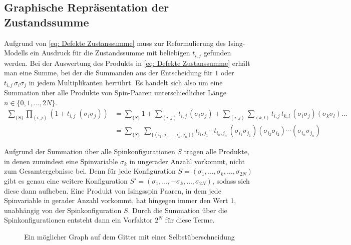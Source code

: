 \subsection{Graphische Repräsentation der Zustandssumme} \label{sec: GR_Zustandssumme}

Aufgrund von \eqref{eq: Defekte Zustanssumme} muss zur Reformulierung des Ising-Modells ein Ausdruck für die Zustandssumme mit beliebigen $t_{i,j}$ gefunden werden.
Bei der Auswertung des Produkts in \eqref{eq: Defekte Zustanssumme} erhält man eine Summe, bei der die Summanden aus der Entscheidung für $1$ oder $t_{i,j}\,\sigma_i \sigma_j$ in jedem Multiplikanten herrührt. Es handelt sich also um eine Summation über alle Produkte von Spin-Paaren unterschiedlicher Länge $n \in \{0,1,\dots ,2N\}$. 
\begin{align}
\sum_{\{S\}} \prod_{(i,j)} (1 +  t_{i,j} \; (\sigma_i \sigma_j)) 
&= 
\sum_{\{S\}} 1 + \sum_{(i,j)} t_{i,j}\,(\sigma_i \sigma_j) + \sum_{(i,j)}\sum_{(k,l)} t_{i,j}\, t_{k,l}\,(\sigma_i \sigma_j)  (\sigma_k \sigma_l) \dots \nonumber \\
&= \sum_{\{S\}} \, \sum_{\{(i_1,j_1,...,i_n,j_n)\}} t_{i_1,j_1} \cdots t_{i_n,j_n} \, (\sigma_{i_1} \sigma_{j_1})(\sigma_{i_2} \sigma_{i_2}) \cdots (\sigma_{i_n} \sigma_{j_n}) \nonumber
\end{align}

\noindent Aufgrund der Summation über alle Spinkonfigurationen $S$ tragen alle Produkte, in denen zumindest eine Spinvariable $\sigma_k$ in ungerader Anzahl vorkommt, nicht zum Gesamtergebnisse bei. Denn für jede Konfiguration $S = (\sigma_1, \dots, \sigma_k, \dots, \sigma_{2N})$ gibt es genau eine weitere Konfiguration $S' = (\sigma_1, \dots, -\sigma_k, \dots, \sigma_{2N})$, sodass sich diese dann aufheben. Eine Produkt von Isingsspin Paaren, in dem jede Spinvariable in gerader Anzahl vorkommt, hat hingegen immer den Wert 1, unabhängig von der Spinkonfiguration $S$. Durch die Summation über die Spinkonfigurationen entsteht dann ein Vorfaktor $2^N$ für diese Terme.
\begin{figure}[h!]
    \centering
    \begin{tikzpicture}[scale = 1.2]
    
    \end{tikzpicture}
    \caption{Ein möglicher Graph auf dem Gitter mit einer Selbstüberschneidung}
    \label{Abb: erlaubte Graphen}
\end{figure}


